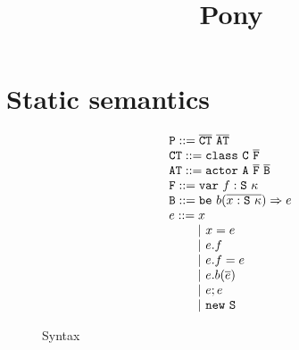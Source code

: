 \documentclass{article}
\title{Pony}
\renewcommand{\tt}[1]{\mathtt{#1}}
\newcommand{\seq}[1]{\overline{#1}}
\begin{document}
\maketitle

\section{Static semantics}
\begin{figure}[ht!]
\[ \begin{array}[t]{l@{\hspace{2mm}}l}
\tt{P} ::= \seq{\tt{CT}}\ \seq{\tt{AT}}\\
\tt{CT} ::= \tt{class}\ \tt{C}\ \seq{\tt{F}}\\
\tt{AT} ::= \tt{actor}\ \tt{A}\ \seq{\tt{F}}\ \seq{\tt{B}}\\
\tt{F} ::= \tt{var}\ f : \tt{S}\ \kappa\\
\tt{B} ::= \tt{be}\ b(\seq{x: \tt{S}\ \kappa}) \Rightarrow e\\
e ::= x \\
\qquad ~|~ x = e \\
\qquad ~|~ e.f \\
\qquad ~|~ e.f = e \\
\qquad ~|~ e.b(\seq{e}) \\
\qquad ~|~ e ; e\\
\qquad ~|~ \tt{new}\ \tt{S}
\end{array} \]
\caption{Syntax}
\end{figure}

\begin{figure}[ht!]
    \centering
\end{figure}
\end{document}
